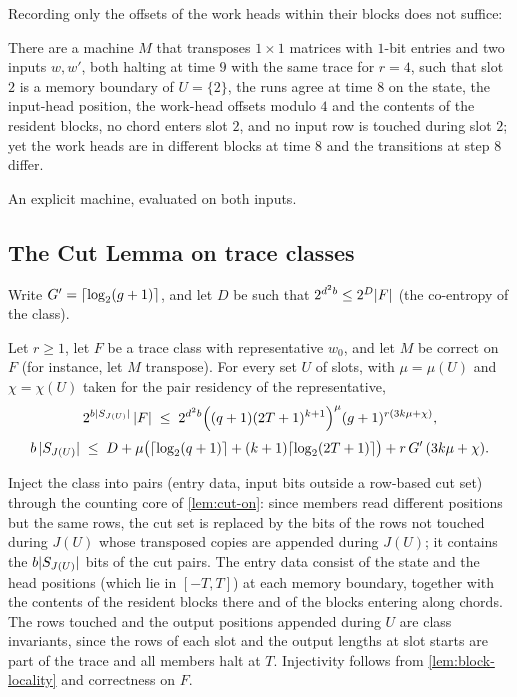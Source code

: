 Recording only the offsets of the work heads within their blocks does not suffice:

\begin{proposition}\label{prop:offsets}
There are a machine $M$ that transposes $1\times1$ matrices with $1$-bit entries and two inputs
$w,w'$, both halting at time $9$ with the same trace for $r=4$, such that slot $2$ is a memory
boundary of $U=\{2\}$, the runs agree at time $8$ on the state, the input-head position, the
work-head offsets modulo $4$ and the contents of the resident blocks, no chord enters slot $2$, and
no input row is touched during slot $2$; yet the work heads are in different blocks at time $8$
and the transitions at step $8$ differ.
\end{proposition}

\begin{outline}
An explicit machine, evaluated on both inputs.
\end{outline}

\subsection{The Cut Lemma on trace classes}

Write $G'=\lceil \log_2 (g+1) \rceil$, and let $D$ be such that $2^{d^2b}\le 2^D\lvert F \rvert$ (the co-entropy of the
class).

\begin{lemma}\label{lem:cut-trace}
Let $r\ge1$, let $F$ be a trace class with representative $w_0$, and let $M$ be correct on $F$ (for
instance, let $M$ transpose). For every set $U$ of slots, with $\mu=\mu(U)$ and $\chi=\chi(U)$ taken
for the pair residency of the representative,
\[
  2^{b\lvert S_{J(U)} \rvert}\,\lvert F \rvert\;\le\;2^{d^2b}\Bigl((q+1)(2T+1)^{k+1}\Bigr)^{\mu}(g+1)^{r(3k\mu+\chi)},
\]
\[
  b\,\lvert S_{J(U)} \rvert\;\le\;D+\mu\bigl(\lceil \log_2 (q+1) \rceil+(k+1)\lceil \log_2 (2T+1) \rceil\bigr)+r\,G'\,(3k\mu+\chi).
\]
\end{lemma}

\begin{outline}
Inject the class into pairs (entry data, input bits outside a row-based cut set) through the counting core
of \cref{lem:cut-on}: since members read different positions but the same rows, the cut set is replaced by
the bits of the rows not touched during $J(U)$ whose transposed copies are appended during $J(U)$; it
contains the $b\lvert S_{J(U)} \rvert$ bits of the cut pairs. The entry data consist of the state and the head
positions (which lie in $[-T,T]$) at each memory boundary, together with the contents of the resident blocks
there and of the blocks entering along chords. The rows touched and the output positions appended during
$U$ are class invariants, since the rows of each slot and the output lengths at slot starts are part of the
trace and all members halt at $T$. Injectivity follows from \cref{lem:block-locality} and correctness on
$F$.
\end{outline}

